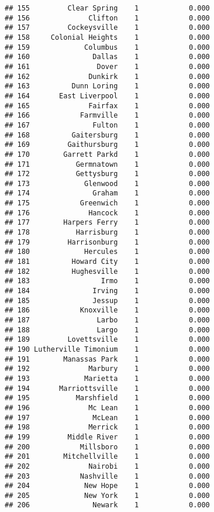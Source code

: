 \documentclass[]{article}
\begin{document}
\begin{verbatim}
## 155         Clear Spring    1            0.000
## 156              Clifton    1            0.000
## 157         Cockeysville    1            0.000
## 158     Colonial Heights    1            0.000
## 159             Columbus    1            0.000
## 160               Dallas    1            0.000
## 161                Dover    1            0.000
## 162              Dunkirk    1            0.000
## 163          Dunn Loring    1            0.000
## 164       East Liverpool    1            0.000
## 165              Fairfax    1            0.000
## 166            Farmville    1            0.000
## 167               Fulton    1            0.000
## 168          Gaitersburg    1            0.000
## 169         Gaithursburg    1            0.000
## 170        Garrett Parkd    1            0.000
## 171           Germnatown    1            0.000
## 172           Gettysburg    1            0.000
## 173             Glenwood    1            0.000
## 174               Graham    1            0.000
## 175            Greenwich    1            0.000
## 176              Hancock    1            0.000
## 177        Harpers Ferry    1            0.000
## 178           Harrisburg    1            0.000
## 179         Harrisonburg    1            0.000
## 180             Hercules    1            0.000
## 181          Howard City    1            0.000
## 182          Hughesville    1            0.000
## 183                 Irmo    1            0.000
## 184               Irving    1            0.000
## 185               Jessup    1            0.000
## 186            Knoxville    1            0.000
## 187                Larbo    1            0.000
## 188                Largo    1            0.000
## 189         Lovettsville    1            0.000
## 190 Lutherville Timonium    1            0.000
## 191        Manassas Park    1            0.000
## 192              Marbury    1            0.000
## 193             Marietta    1            0.000
## 194       Marriottsville    1            0.000
## 195           Marshfield    1            0.000
## 196              Mc Lean    1            0.000
## 197               McLean    1            0.000
## 198              Merrick    1            0.000
## 199         Middle River    1            0.000
## 200            Millsboro    1            0.000
## 201        Mitchellville    1            0.000
## 202              Nairobi    1            0.000
## 203            Nashville    1            0.000
## 204             New Hope    1            0.000
## 205             New York    1            0.000
## 206               Newark    1            0.000

\end{verbatim}
\end{document}
